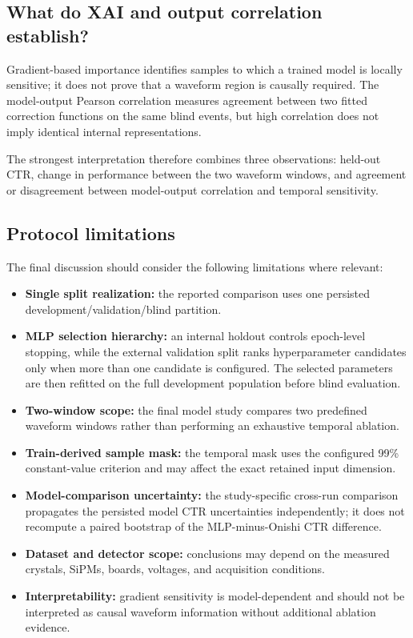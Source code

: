 \subsection{What do XAI and output correlation establish?}

Gradient-based importance identifies samples to which a trained model is locally sensitive; it does not prove that a waveform region is causally required. The model-output Pearson correlation measures agreement between two fitted correction functions on the same blind events, but high correlation does not imply identical internal representations.

The strongest interpretation therefore combines three observations: held-out CTR, change in performance between the two waveform windows, and agreement or disagreement between model-output correlation and temporal sensitivity.

\subsection{Protocol limitations}

The final discussion should consider the following limitations where relevant:
\begin{itemize}
    \item \textbf{Single split realization:} the reported comparison uses one persisted development/validation/blind partition.
    \item \textbf{MLP selection hierarchy:} an internal holdout controls epoch-level stopping, while the external validation split ranks hyperparameter candidates only when more than one candidate is configured. The selected parameters are then refitted on the full development population before blind evaluation.
    \item \textbf{Two-window scope:} the final model study compares two predefined waveform windows rather than performing an exhaustive temporal ablation.
    \item \textbf{Train-derived sample mask:} the temporal mask uses the configured 99\% constant-value criterion and may affect the exact retained input dimension.
    \item \textbf{Model-comparison uncertainty:} the study-specific cross-run comparison propagates the persisted model CTR uncertainties independently; it does not recompute a paired bootstrap of the MLP-minus-Onishi CTR difference.
    \item \textbf{Dataset and detector scope:} conclusions may depend on the measured crystals, SiPMs, boards, voltages, and acquisition conditions.
    \item \textbf{Interpretability:} gradient sensitivity is model-dependent and should not be interpreted as causal waveform information without additional ablation evidence.
\end{itemize}

